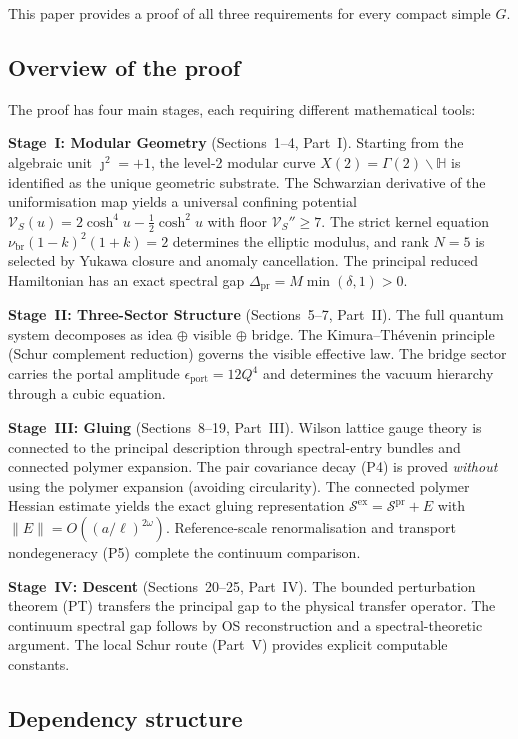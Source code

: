 \documentclass[12pt]{article}
\theoremstyle{plain}
\theoremstyle{definition}
\numberwithin{equation}{section}
\newcommand{\HH}{\mathbb{H}}
\newcommand{\pr}{\mathrm{pr}}
\newcommand{\br}{\mathrm{br}}
\newcommand{\ex}{\mathrm{ex}}
\begin{document}
This paper provides a proof of all three requirements for every compact simple $G$.

\subsection*{Overview of the proof}

The proof has four main stages, each requiring different mathematical tools:

\textbf{Stage~I: Modular Geometry} (Sections~1--4, Part~I).  Starting from the algebraic unit $\jmath^2=+1$, the level-2 modular curve $X(2)=\Gamma(2)\backslash\HH$ is identified as the unique geometric substrate.  The Schwarzian derivative of the uniformisation map yields a universal confining potential $\mathcal{V}_S(u)=2\cosh^4 u-\frac{1}{2}\cosh^2 u$ with floor $\mathcal{V}_S''\geq 7$.  The strict kernel equation $\nu_{\br}(1-k)^2(1+k)=2$ determines the elliptic modulus, and rank $N=5$ is selected by Yukawa closure and anomaly cancellation.  The principal reduced Hamiltonian has an exact spectral gap $\Delta_{\pr}=M\min(\delta,1)>0$.

\textbf{Stage~II: Three-Sector Structure} (Sections~5--7, Part~II).  The full quantum system decomposes as idea $\oplus$ visible $\oplus$ bridge.  The Kimura--Th\'evenin principle (Schur complement reduction) governs the visible effective law.  The bridge sector carries the portal amplitude $\epsilon_{\mathrm{port}}=12Q^4$ and determines the vacuum hierarchy through a cubic equation.

\textbf{Stage~III: Gluing} (Sections~8--19, Part~III).  Wilson lattice gauge theory is connected to the principal description through spectral-entry bundles and connected polymer expansion.  The pair covariance decay (P4) is proved \emph{without} using the polymer expansion (avoiding circularity).  The connected polymer Hessian estimate yields the exact gluing representation $\mathcal{S}^{\ex}=\mathcal{S}^{\pr}+E$ with $\|E\|=O((a/\ell)^{2\omega})$.  Reference-scale renormalisation and transport nondegeneracy (P5) complete the continuum comparison.

\textbf{Stage~IV: Descent} (Sections~20--25, Part~IV).  The bounded perturbation theorem (PT) transfers the principal gap to the physical transfer operator.  The continuum spectral gap follows by OS reconstruction and a spectral-theoretic argument.  The local Schur route (Part~V) provides explicit computable constants.

\subsection*{Dependency structure}
\end{document}
